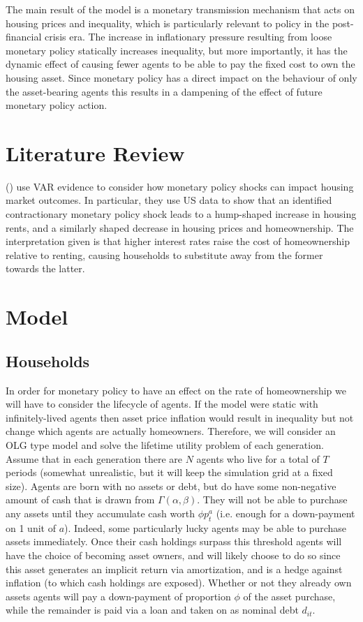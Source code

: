 \documentclass{article}
\begin{document}
The main result of the model is a monetary transmission mechanism that acts on housing prices and inequality, which is particularly relevant to policy in the post-financial crisis era. The increase in inflationary pressure resulting from loose monetary policy statically increases inequality, but more importantly, it has the dynamic effect of causing fewer agents to be able to pay the fixed cost to own the housing asset. Since monetary policy has a direct impact on the behaviour of only the asset-bearing agents this results in a dampening of the effect of future monetary policy action.

\section{Literature Review} \label{lit_review}

\citeauthor{dias2019monetary} (\citeyear{dias2019monetary}) use VAR evidence to consider how monetary policy shocks can impact housing market outcomes. In particular, they use US data to show that an identified contractionary monetary policy shock leads to a hump-shaped increase in housing rents, and a similarly shaped decrease in housing prices and homeownership. The interpretation given is that higher interest rates raise the cost of homeownership relative to renting, causing households to substitute away from the former towards the latter.


\section{Model} \label{model}

\subsection{Households} \label{households}

In order for monetary policy to have an effect on the rate of homeownership we will have to consider the lifecycle of agents. If the model were static with infinitely-lived agents then asset price inflation would result in inequality but not change which agents are actually homeowners. Therefore, we will consider an OLG type model and solve the lifetime utility problem of each generation. Assume that in each generation there are $N$ agents who live for a total of $T$ periods (somewhat unrealistic, but it will keep the simulation grid at a fixed size). Agents are born with no assets or debt, but do have some non-negative amount of cash that is drawn from $\Gamma (\alpha, \beta)$. They will not be able to purchase any assets until they accumulate cash worth $\phi p^a_t$ (i.e. enough for a down-payment on 1 unit of $a$). Indeed, some particularly lucky agents may be able to purchase assets immediately. Once their cash holdings surpass this threshold agents will have the choice of becoming asset owners, and will likely choose to do so since this asset generates an implicit return via amortization, and is a hedge against inflation (to which cash holdings are exposed). Whether or not they already own assets agents will pay a down-payment of proportion $\phi$ of the asset purchase, while the remainder is paid via a loan and taken on as nominal debt $d_{it}$.
\end{document}
